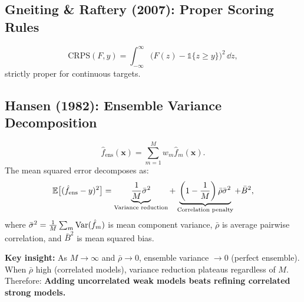 \subsection{Gneiting \& Raftery (2007): Proper Scoring Rules} \label{subsec:gneiting2007}
\begin{equation}
\mathrm{CRPS}(F,y)=\int_{-\infty}^{\infty}\big(F(z)-\mathbb 1\{z\ge y\}\big)^2\,\dd z,
\end{equation}
strictly proper for continuous targets.

\subsection{Hansen (1982): Ensemble Variance Decomposition} \label{subsec:hansen1982}


\begin{equation}
\hat{f}_{\text{ens}}(\mathbf{x}) = \sum_{m=1}^{M} w_m \hat{f}_m(\mathbf{x}).
\end{equation}
The mean squared error decomposes as:
\begin{equation}\label{eq:hansen-decomposition}
\mathbb{E}\big[(\hat{f}_{\text{ens}} - y)^2\big] = \underbrace{\frac{1}{M} \bar{\sigma}^2}_{\text{Variance reduction}} + \underbrace{\left(1 - \frac{1}{M}\right) \bar{\rho} \bar{\sigma}^2}_{\text{Correlation penalty}} + \bar{B}^2,
\end{equation}
where $\bar{\sigma}^2 = \frac{1}{M}\sum_m \mathrm{Var}(\hat{f}_m)$ is mean component variance, $\bar{\rho}$ is average pairwise correlation, and $\bar{B}^2$ is mean squared bias.

\textbf{Key insight:} As $M \to \infty$ and $\bar{\rho} \to 0$, ensemble variance $\to 0$ (perfect ensemble). When $\bar{\rho}$ high (correlated models), variance reduction plateaus regardless of $M$. Therefore: \textbf{Adding uncorrelated weak models beats refining correlated strong models.}

